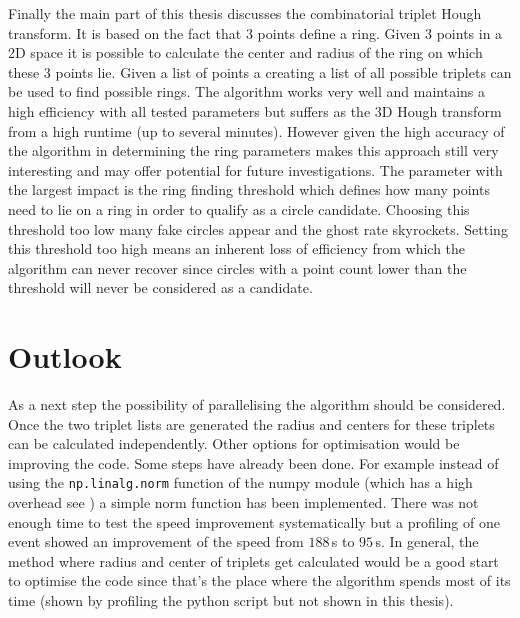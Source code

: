 \documentclass[11pt]{scrreprt}
\begin{document}
Finally the main part of this thesis discusses the combinatorial triplet Hough transform. It is based on the fact that 3 points define a ring.
Given 3 points in a 2D space it is possible to calculate the center and radius of the ring on which these 3 points lie. Given a list
of points a creating a list of all possible triplets can be used to find possible rings. The algorithm works very well and maintains a high efficiency
with all tested parameters but suffers as the 3D Hough transform from a high runtime (up to several minutes). However given the high accuracy
of the algorithm in determining the ring parameters makes this approach still very interesting and may offer potential for future investigations.
The parameter with the largest impact is the ring finding threshold which defines how many points need to lie on a ring in order to qualify as a 
circle candidate. Choosing this threshold too low many fake circles appear and the ghost rate skyrockets. Setting this threshold too high
means an inherent loss of efficiency from which the algorithm can never recover since circles with a point count lower than the threshold
will never be considered as a candidate.

\section{Outlook} %
\label{sec:outlook}
As a next step the possibility of parallelising the algorithm should be considered. Once the two triplet lists are generated the radius and centers
for these triplets can be calculated independently.
Other options for optimisation would be improving the code. Some steps have already been done. For example instead of using the \texttt{np.linalg.norm} function of the numpy module (which has a high overhead see \cite{NumpyNorm}) a simple norm function has been implemented. There was not enough time to test the speed improvement systematically but a profiling of one event showed an improvement of the speed from $188$\,s to $95$\,s. In general, the method where
radius and center of triplets get calculated would be a good start to optimise the code since that's the place where the algorithm spends most of
 its time (shown by profiling the python script but not shown in this thesis).

\printbibliography
\end{document}

